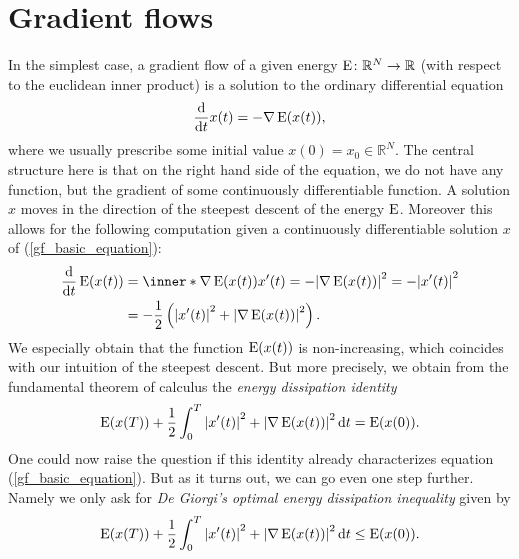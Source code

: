 \section{Gradient flows}
	\label{section_gradient_flows}
In the simplest case, a gradient flow of a given energy $ \operatorname{E} \colon \mathbb{ R }^{ N } \to \mathbb{ R } $ (with respect to the euclidean inner product) is a solution to the ordinary differential equation
\begin{equation}
	\label{gf_basic_equation}
	\dv{ t } x ( t ) = - \nabla \operatorname{E} ( x ( t ) ) ,
\end{equation}
where we usually prescribe some initial value $ x ( 0 ) = x_{ 0 } \in \mathbb{ 
R }^{ N } $. The central structure here is that on the right hand side of the 
equation, we do not have any function, but the gradient of some continuously 
differentiable function. A solution $ x $ moves in the 
direction of the steepest descent of the energy $ \operatorname{E} $. Moreover this 
allows for the following computation given a continuously differentiable 
solution $ x $ of (\ref{gf_basic_equation}):
\begin{align*}
	\dv{ t } \energy ( x ( t ) ) 
	& =
	\inner*{ \nabla \energy ( x ( t ) ) }{ x ' ( t ) }
	=
	- \abs{ \nabla \energy ( x ( t ) ) }^{ 2 }
	=
	- \abs{ x' ( t ) }^{ 2 }
	\\
	& =
	- \frac{ 1 }{ 2 }
	\left(
		\abs{ x'( t ) }^{ 2 }
		+
		\abs{ \nabla \energy ( x ( t ) ) }^{ 2 }
	\right).
\end{align*}
We especially obtain that the function $ \operatorname{E} ( x ( t ) ) $ is 
non-increasing, which coincides with our intuition of the steepest descent. But 
more precisely, we obtain from the 
fundamental theorem of calculus the \emph{energy dissipation identity}
\begin{equation}
	\label{basic_energy_dissipation_identity}
	\operatorname{E} ( x ( T ) )
	+
	\frac{ 1 }{ 2 }
	\int_{ 0 }^{ T }
		\abs{ x' ( t ) }^{ 2 }
		+
		\abs{ \nabla \operatorname{E} ( x ( t ) ) }^{ 2 }
	\dd{ t }
	= 
	\operatorname{E} ( x ( 0 ) ).
\end{equation}
One could now raise the question if this identity already characterizes 
equation (\ref{gf_basic_equation}). 
But as it turns out, we can go even one step further. Namely we only ask for 
\emph{De Giorgi's optimal energy dissipation inequality} given by
\begin{equation}
	\label{basic_optimal_energy_dissipation_inequality}
	\operatorname{E} ( x ( T ) )
	+
	\frac{ 1 }{ 2 }
	\int_{ 0 }^{ T }
		\abs{ x' ( t ) }^{ 2 }
		+
		\abs{ \nabla \operatorname{E} ( x ( t ) ) }^{ 2 }
	\dd{ t }
	\leq
	\operatorname{E} ( x ( 0 ) ).
\end{equation}
